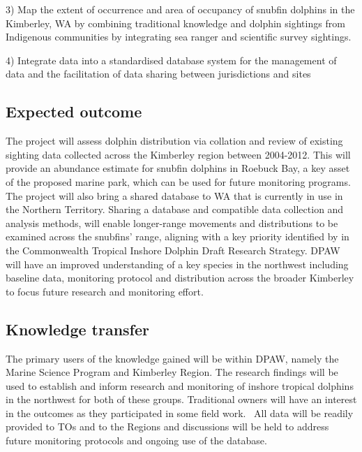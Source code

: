 \documentclass[version=last,
    paper=a4,                               %
    10pt,                                   %
    dvipsnames,
    oneside,                              %
    headings=openany,                       %
    open=any,
    BCOR=7mm,                               %
    DIV=15,     %
]{scrbook}
\begin{document}
3) Map the extent of occurrence and area of occupancy of snubfin
dolphins in the Kimberley, WA by combining traditional knowledge and
dolphin sightings from Indigenous communities by integrating sea ranger
and scientific survey sightings.

4) Integrate data into a standardised database system for the management
of data and the facilitation of data sharing between jurisdictions and
sites~




\subsection*{Expected outcome}

The project will assess dolphin distribution via collation and review of
existing sighting data collected across the Kimberley region between
2004-2012. This will provide an abundance estimate for snubfin dolphins
in Roebuck Bay, a key asset of the proposed marine park, which can be
used for future monitoring programs.~ The project will also bring a
shared database to WA that is currently in use in the Northern
Territory. Sharing a database and compatible data collection and
analysis methods, will enable longer-range movements and distributions
to be examined across the snubfins' range, aligning with a key priority
identified by in the Commonwealth Tropical Inshore Dolphin Draft
Research Strategy. DPAW will have an improved understanding of a key
species in the northwest including baseline data, monitoring protocol
and distribution across the broader Kimberley to focus future research
and monitoring effort.~~




\subsection*{Knowledge transfer}

The primary users of the knowledge gained will be within DPAW, namely
the Marine Science Program and Kimberley Region. The research findings
will be used to establish and inform research and monitoring of inshore
tropical dolphins in the northwest for both of these groups. Traditional
owners will have an interest in the outcomes as they participated in
some field work.~ All data will be readily provided to TOs and to the
Regions and discussions will be held to address future monitoring
protocols and ongoing use of the database.~
\end{document}
